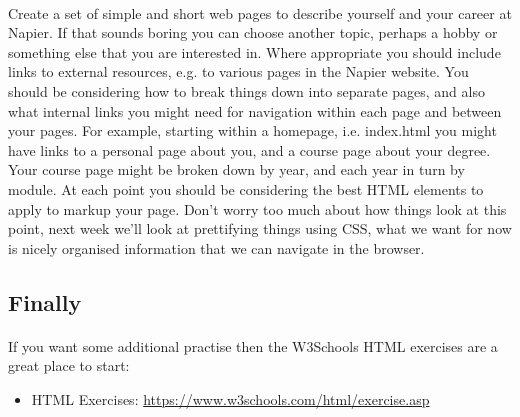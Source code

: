 \documentclass[10pt, a4paper, twosize]{article}
\begin{document}
\paragraph{} Create a set of simple and short web pages to describe yourself and your career at Napier. If that sounds boring you can choose another topic, perhaps a hobby or something else that you are interested in. Where appropriate you should include links to external resources, e.g. to various pages in the Napier website. You should be considering how to break things down into separate pages, and also what internal links you might need for navigation within each page and between your pages. For example, starting within a homepage, i.e. index.html you might have links to a personal page about you, and a course page about your degree. Your course page might be broken down by year, and each year in turn by module. At each point you should be considering the best HTML elements to apply to markup your page. Don't worry too much about how things look at this point, next week we'll look at prettifying things using CSS, what we want for now is nicely organised information that we can navigate in the browser.

\subsection{Finally}
\paragraph{} If you want some additional practise then the W3Schools HTML exercises are a great place to start:

\begin{itemize}
\item HTML Exercises: \url{https://www.w3schools.com/html/exercise.asp}
\end{itemize}





%

%
\end{document}
